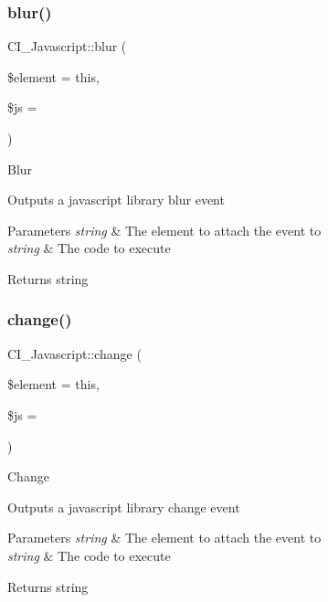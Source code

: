 \subsubsection{\texorpdfstring{blur()}{blur()}}
{\footnotesize\ttfamily C\+I\+\_\+\+Javascript\+::blur (\begin{DoxyParamCaption}\item[{}]{\$element = {\ttfamily \textquotesingle{}this\textquotesingle{}},  }\item[{}]{\$js = {\ttfamily \textquotesingle{}\textquotesingle{}} }\end{DoxyParamCaption})}

Blur

Outputs a javascript library blur event


\begin{DoxyParams}{Parameters}
{\em string} & The element to attach the event to \\
\hline
{\em string} & The code to execute \\
\hline
\end{DoxyParams}
\begin{DoxyReturn}{Returns}
string 
\end{DoxyReturn}
\mbox{\label{class_c_i___javascript_aa0dd12f8488bc456487328b42bb2eb85}} 
\subsubsection{\texorpdfstring{change()}{change()}}
{\footnotesize\ttfamily C\+I\+\_\+\+Javascript\+::change (\begin{DoxyParamCaption}\item[{}]{\$element = {\ttfamily \textquotesingle{}this\textquotesingle{}},  }\item[{}]{\$js = {\ttfamily \textquotesingle{}\textquotesingle{}} }\end{DoxyParamCaption})}

Change

Outputs a javascript library change event


\begin{DoxyParams}{Parameters}
{\em string} & The element to attach the event to \\
\hline
{\em string} & The code to execute \\
\hline
\end{DoxyParams}
\begin{DoxyReturn}{Returns}
string 
\end{DoxyReturn}
\mbox{\label{class_c_i___javascript_ac01545c6c79fde0762903c03db793c71}} 
